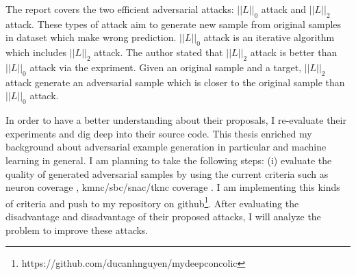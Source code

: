 \documentclass[12pt]{article}
\begin{document}
The report covers the two efficient adversarial attacks: $||L||_0$ attack and $||L||_2$ attack. These types of attack aim to generate new sample from original samples in dataset which make wrong prediction. $||L||_0$ attack is an iterative algorithm which includes $||L||_2$ attack. The author stated that $||L||_2$ attack is better than $||L||_0$ attack via the expriment. Given an original sample and a target,  $||L||_2$ attack generate an adversarial sample which is closer to the original sample than $||L||_0$ attack. 

In order to have a better understanding about their proposals, I re-evaluate their experiments and dig deep into their source code. This thesis enriched my background about adversarial example generation in particular and machine learning in general. I am planning to take the following steps: (i) evaluate the quality of generated adversarial samples by using the current criteria such as neuron coverage \cite{DeepXplore}, kmnc/sbc/snac/tknc coverage \cite{deep-gauge}. I am implementing this kinds of criteria and push to my repository on github\footnote{https://github.com/ducanhnguyen/mydeepconcolic}. After evaluating the disadvantage and disadvantage of their proposed attacks, I will analyze the problem to improve these attacks.


 

\end{document}
